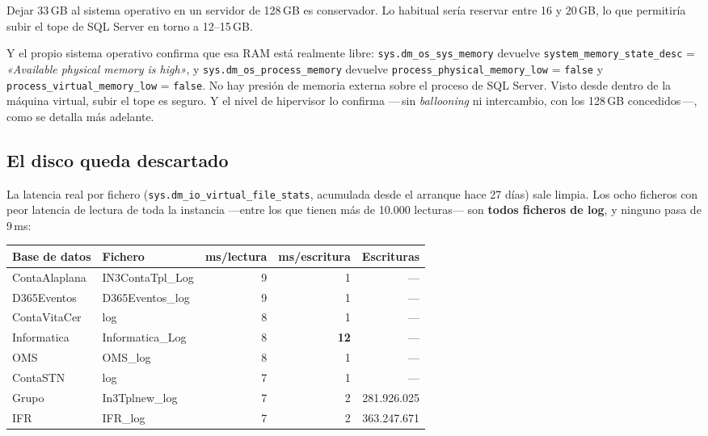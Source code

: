 \documentclass[11pt,a4paper]{article}
\newcommand{\cod}[1]{\texttt{\small #1}}
\newcommand{\aviso}[1]{\textcolor{ambar}{\textbf{#1}}}
\begin{document}
Dejar 33\,GB al sistema operativo en un servidor de 128\,GB es conservador.
Lo habitual sería reservar entre 16 y 20\,GB, lo que permitiría subir el
tope de SQL Server en torno a 12--15\,GB.

Y el propio sistema operativo confirma que esa RAM está realmente libre:
\cod{sys.dm\_os\_sys\_memory} devuelve \cod{system\_memory\_state\_desc} =
\emph{«Available physical memory is high»}, y
\cod{sys.dm\_os\_process\_memory} devuelve
\cod{process\_physical\_memory\_low} = \cod{false} y
\cod{process\_virtual\_memory\_low} = \cod{false}. No hay presión de memoria
externa sobre el proceso de SQL Server. Visto desde dentro de la máquina
virtual, subir el tope es seguro. Y el nivel de hipervisor lo confirma
—\,sin \emph{ballooning} ni intercambio, con los 128\,GB concedidos\,—, como
se detalla más adelante.

\subsection{El disco queda descartado}

La latencia real por fichero (\cod{sys.dm\_io\_virtual\_file\_stats},
acumulada desde el arranque hace 27 días) sale limpia. Los ocho ficheros con
peor latencia de lectura de toda la instancia —entre los que tienen más de
10.000 lecturas— son \textbf{todos ficheros de log}, y ninguno pasa de 9\,ms:

\begin{table}[h]
\centering
\small
\begin{tabular}{llrrr}
\toprule
\textbf{Base de datos} & \textbf{Fichero} & \textbf{ms/lectura} &
\textbf{ms/escritura} & \textbf{Escrituras} \\
\midrule
ContaAlaplana & IN3ContaTpl\_Log & 9 & 1 & — \\
D365Eventos   & D365Eventos\_log & 9 & 1 & — \\
ContaVitaCer  & log              & 8 & 1 & — \\
Informatica   & Informatica\_Log & 8 & \aviso{12} & — \\
OMS           & OMS\_log         & 8 & 1 & — \\
ContaSTN      & log              & 7 & 1 & — \\
Grupo         & In3Tplnew\_log   & 7 & 2 & 281.926.025 \\
IFR           & IFR\_log         & 7 & 2 & 363.247.671 \\
\bottomrule
\end{tabular}
\end{table}
\end{document}
